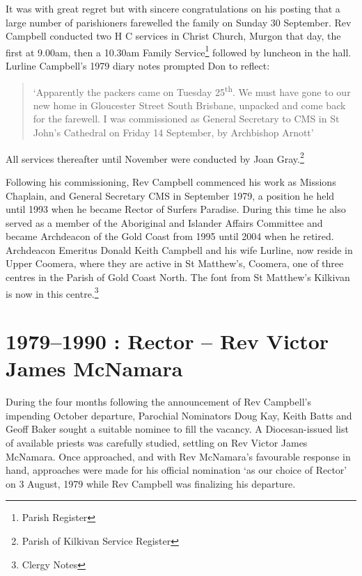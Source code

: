 It was with great regret but with sincere congratulations on his posting
that a large number of parishioners farewelled the family on Sunday 30
September. Rev Campbell conducted two H C services in Christ Church,
Murgon that day, the first at 9.00am, then a 10.30am Family
Service\footnote{Parish Register} followed by luncheon in the hall.
Lurline Campbell's 1979 diary notes prompted Don to reflect:

\begin{quote}
`Apparently the packers came on Tuesday 25\textsuperscript{th}. We must
have gone to our new home in Gloucester Street South Brisbane, unpacked
and come back for the farewell. I was commissioned as General Secretary
to CMS in St John's Cathedral on Friday 14 September, by Archbishop
Arnott'
\end{quote}

All services thereafter until November were conducted by Joan
Gray.\footnote{Parish of Kilkivan Service Register}

Following his commissioning, Rev Campbell commenced his work as Missions
Chaplain, and General Secretary CMS in September 1979, a position he
held until 1993 when he became Rector of Surfers Paradise. During this
time he also served as a member of the Aboriginal and Islander Affairs
Committee and became Archdeacon of the Gold Coast from 1995 until 2004
when he retired. Archdeacon Emeritus Donald Keith Campbell and his wife
Lurline, now reside in Upper Coomera, where they are active in St
Matthew's, Coomera, one of three centres in the Parish of Gold Coast
North. The font from St Matthew's Kilkivan is now in this
centre.\footnote{Clergy Notes}

\hypertarget{rector-rev-victor-james-mcnamara}{%
\chapter{1979--1990 : Rector -- Rev Victor James
McNamara}\label{rector-rev-victor-james-mcnamara}}

During the four months following the announcement of Rev Campbell's
impending October departure, Parochial Nominators Doug Kay, Keith Batts
and Geoff Baker sought a suitable nominee to fill the vacancy. A
Diocesan-issued list of available priests was carefully studied,
settling on Rev Victor James McNamara. Once approached, and with Rev
McNamara's favourable response in hand, approaches were made for his
official nomination `as our choice of Rector' on 3 August, 1979 while
Rev Campbell was finalizing his departure.


